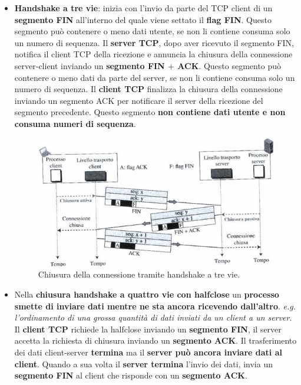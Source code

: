 \documentclass[11pt,a4paper]{article}
\theoremstyle{definition}
\begin{document}
\begin{itemize}
	\item \textbf{Handshake a tre vie}: inizia con l'invio da parte del TCP client
	      di un \textbf{segmento FIN} all'interno del quale viene settato il \textbf{flag FIN}. Questo segmento può contenere o meno dati utente, se non li contiene consuma solo un numero di sequenza.
	      Il \textbf{server TCP}, dopo aver ricevuto il segmento FIN, notifica il client TCP della ricezione e annuncia la chiusura della connessione server-client inviando un \textbf{segmento FIN $+$ ACK}. Questo segmento può contenere o meno dati da parte del server, se non li contiene consuma solo un numero di sequenza.
	      Il \textbf{client TCP} finalizza la chiusura della connessione inviando un segmento ACK per notificare il server della ricezione del segmento precedente. Questo segmento \textbf{non contiene dati utente e non consuma numeri di sequenza}.
	      \begin{figure}[!h]
		      \includegraphics[scale=0.5]{Immagini/Three_wayc.png}
		      \centering
		      \caption{Chiusura della connessione tramite handshake a tre vie.}
	      \end{figure}
	\item Nella \textbf{chiusura handshake a quattro vie con halfclose} un \textbf{processo smette di inviare dati mentre ne sta ancora ricevendo dall'altro}.\textit{ e.g. l'ordinamento di una grossa quantità di dati inviati da un client a un server}. Il \textbf{client TCP} richiede la halfclose inviando un \textbf{segmento FIN}, il server accetta la richiesta di chiusura inviando un \textbf{segmento ACK}. Il trasferimento dei dati client-server \textbf{termina} ma il \textbf{server può ancora inviare dati al client}. Quando a sua volta il \textbf{server termina} l'invio dei dati, invia un \textbf{segmento FIN} al client che risponde con un \textbf{segmento ACK}.
\end{itemize}
\end{document}
